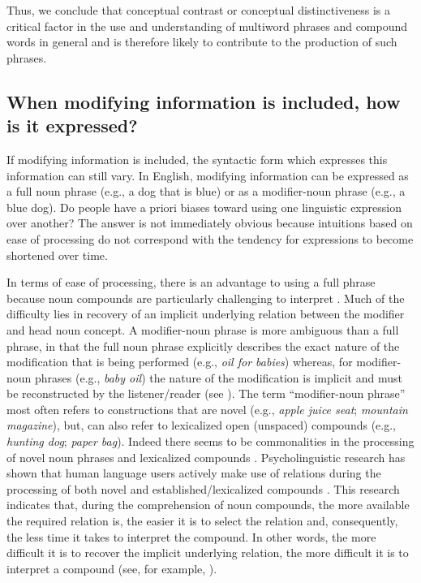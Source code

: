 \documentclass[output=paper]{langsci/langscibook}
\begin{document}
Thus, we conclude that conceptual contrast or conceptual
distinctiveness is a critical factor in the use and understanding of
multiword phrases and compound words in general and is therefore
likely to contribute to the production of such phrases.

\subsection{When modifying information is included, how is it expressed?}

If modifying information is included, the syntactic form which
expresses this information can still vary. In English, modifying
information can be expressed as a full noun phrase (e.g., a dog that
is blue) or as a modifier-noun phrase (e.g., a blue dog). Do people
have a priori biases toward using one linguistic expression over
another? The answer is not immediately obvious because intuitions
based on ease of processing do not correspond with the tendency for
expressions to become shortened over time.

In terms of ease of processing, there is an advantage to using a full
phrase because noun compounds are particularly challenging to
interpret
\citep{lapata2002disambiguation,copestake2005noun,libben2014nature}. Much
of the difficulty lies in recovery of an implicit underlying relation
between the modifier and head noun concept. A modifier-noun phrase is
more ambiguous than a full phrase, in that the full noun phrase
explicitly describes the exact nature of the modification that is
being performed (e.g., \textit{oil for babies}) whereas, for
modifier-noun phrases (e.g., \textit{baby oil}) the nature of the
modification is implicit and must be reconstructed by the
listener/reader (see \citealt{levi1978syntax,gagne1997influence}). The
term “modifier-noun phrase” most often refers to constructions that
are novel (e.g., \textit{apple juice seat}; \textit{mountain
  magazine}), but, can also refer to lexicalized open (unspaced)
compounds (e.g., \textit{hunting dog}; \textit{paper bag}). Indeed
there seems to be commonalities in the processing of novel noun
phrases and lexicalized compounds \citep{gagne2006using}. Psycholinguistic research has shown that human language users actively make use of relations during the processing of
both novel and established/lexicalized compounds
\citep{gagne1997influence,gagne2002lexical,gagne2009constituent,gagne2014conceptual}. This
research indicates that, during the comprehension of noun compounds,
the more available the required relation is, the easier it is to
select the relation and, consequently, the less time it takes to
interpret the compound. In other words, the more difficult it is to
recover the implicit underlying relation, the more difficult it is to
interpret a compound (see, for example,
\citealt{gagne1997influence,spalding2014relational,schmidtke2018conceptual}).
\end{document}
